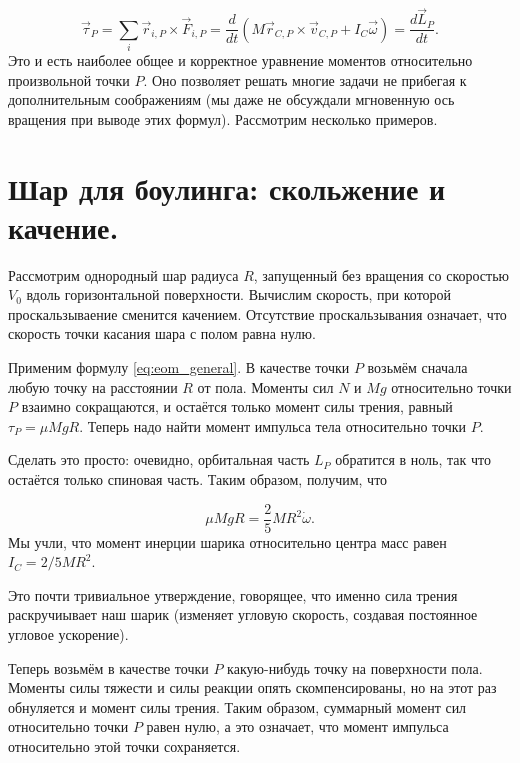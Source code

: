 \documentclass[a4paper,12pt]{article}
\begin{document}
\begin{equation}
  \label{eq:eom_general}
  \vec{\tau}_P = \sum_i \vec{r}_{i,P} \times \vec{F}_{i,P} =
  \frac{d}{dt} \left(M \vec{r}_{C,P} \times \vec{v}_{C,P} + I_C
    \vec{\omega}  \right) =   \frac{d\vec{L}_P}{dt}. 
\end{equation}
Это и есть наиболее общее и корректное уравнение моментов относительно
произвольной точки $P$. Оно позволяет решать многие задачи не прибегая
к дополнительным соображениям (мы даже не обсуждали мгновенную ось
вращения при выводе этих формул). Рассмотрим несколько примеров.

\section{Шар для боулинга: скольжение и качение. }
\label{sec:bowling_sliding_rolling}

Рассмотрим однородный шар радиуса $R$, запущенный без вращения со
скоростью $V_0$ вдоль горизонтальной поверхности. Вычислим скорость,
при которой проскальзываение сменится качением. Отсутствие
проскальзывания означает, что скорость точки касания шара с полом
равна нулю.

Применим формулу \eqref{eq:eom_general}. В качестве точки $P$ возьмём
сначала любую точку на расстоянии $R$ от пола. Моменты сил $N$ и $Mg$
относительно точки $P$ взаимно сокращаются, и остаётся только момент
силы трения, равный $\tau_P = \mu M g R$. Теперь надо найти момент
импульса тела относительно точки $P$.

Сделать это просто: очевидно, орбитальная часть $L_P$ обратится в
ноль, так что остаётся только спиновая часть. Таким образом, получим,
что

\begin{equation}
  \label{eq:ball_eom_1}
  \mu M g R = \frac{2}{5} MR^2 \dot{\omega}. 
\end{equation}
Мы учли, что момент инерции шарика относительно центра масс равен $I_C
= 2/5 MR^2$. 

Это почти тривиальное утверждение, говорящее, что именно сила трения
раскручиывает наш шарик (изменяет угловую скорость, создавая
постоянное угловое ускорение).

Теперь возьмём в качестве точки $P$ какую-нибудь точку на поверхности
пола. Моменты силы тяжести и силы реакции опять скомпенсированы, но на
этот раз обнуляется и момент силы трения. Таким образом, суммарный
момент сил относительно точки $P$ равен нулю, а это означает, что
момент импульса относительно этой точки сохраняется.
\end{document}
